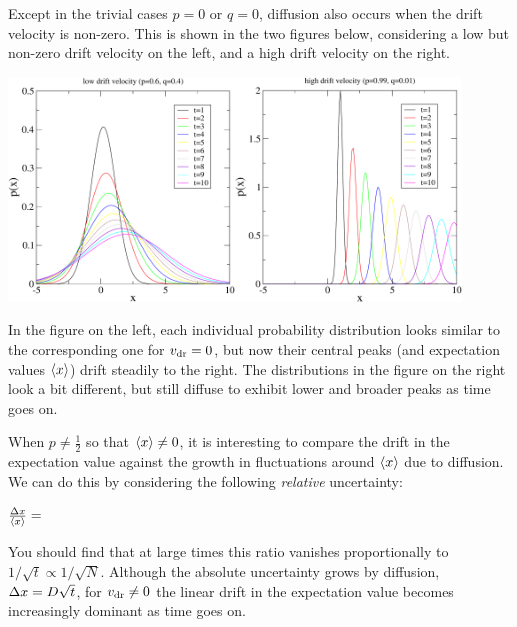 Except in the trivial cases $p = 0$ or $q = 0$, diffusion also occurs when the drift velocity is non-zero.
This is shown in the two figures below, considering a low but non-zero drift velocity on the left, and a high drift velocity on the right.
\begin{center} %
  \includegraphics[width=0.45\textwidth]{figs/unit01_diff_low.pdf}\hfill \includegraphics[width=0.45\textwidth]{figs/unit01_diff_high.pdf}
\end{center}
In the figure on the left, each individual probability distribution looks similar to the corresponding one for $v_{\mathrm{dr}} = 0$, but now their central peaks (and expectation values $\left\langle x \right\rangle$) drift steadily to the right.
The distributions in the figure on the right look a bit different, but still diffuse to exhibit lower and broader peaks as time goes on.

When $p \neq \frac{1}{2}$ so that $\left\langle x \right\rangle \neq 0$, it is interesting to compare the drift in the expectation value against the growth in fluctuations around $\left\langle x \right\rangle$ due to diffusion.
We can do this by considering the following \textit{relative} uncertainty:
\begin{mdframed}
  $\frac{\Delta x}{\left\langle x \right\rangle} = $ \\[100 pt]
\end{mdframed}
You should find that at large times this ratio vanishes proportionally to $1 / \sqrt{t} \propto 1 / \sqrt{N}$.
Although the absolute uncertainty grows by diffusion, $\Delta x = D \sqrt{t}$, for $v_{\mathrm{dr}} \neq 0$ the linear drift in the expectation value becomes increasingly dominant as time goes on.



